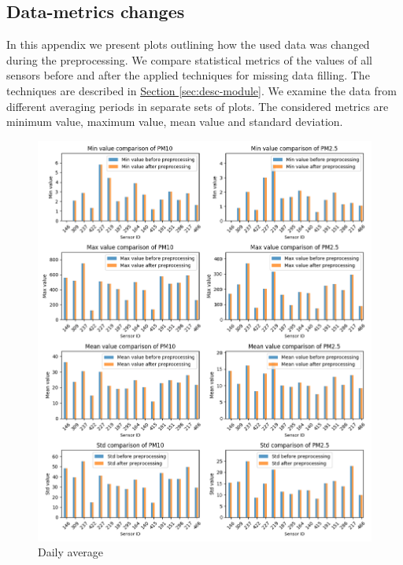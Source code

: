\documentclass[12pt,a4paper,twoside]{scrartcl}
\numberwithin{equation}{section}
\newcommand{\refsec}[1]{\hyperref[#1]{Section \ref*{#1}}}
\newcounter{mypagecount}%
\newenvironment{interlude}{%
  \clearpage
  \setcounter{mypagecount}{\value{page}}%
  \thispagestyle{empty}%
  \pagestyle{empty}%
}{%
  \clearpage
  \setcounter{page}{\value{mypagecount}}%
}
\let\chapter=\section %
\begin{document}
\begin{interlude}
\begin{appendices}
    \chapter{Data-metrics changes}\label{app:b}
    In this appendix we present plots outlining how the used data was changed during the preprocessing. We compare statistical metrics of the values of all sensors before and after the applied techniques for missing data filling. The techniques are described in \refsec{sec:desc-module}. We examine the data from different averaging periods in separate sets of plots. The considered metrics are minimum value, maximum value, mean value and standard deviation.
    \begin{center}
      \begin{figure}[h!] \centerline{\includegraphics[width=1.1\textwidth,height=1.1\textwidth]{figures/data_files_changes/1D_sensor_metrics}}
        \caption[Metrics change during preprocessing (one day average)]{Daily average}
      \end{figure}


\end{center}
\end{appendices}
\end{interlude}
\end{document}
